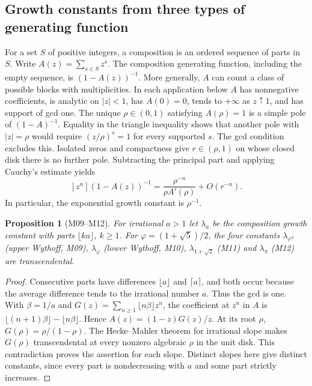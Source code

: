 \documentclass[11pt,a4paper]{article}
\newtheorem{proposition}[theorem]{Proposition}
\theoremstyle{definition}
\theoremstyle{remark}
\begin{document}
\subsection{Growth constants from three types of generating function}

For a set $S$ of positive integers, a composition is an ordered sequence of
parts in $S$. Write $A(z)=\sum_{s\in S}z^s$. The composition generating
function, including the empty sequence, is $(1-A(z))^{-1}$. More generally,
$A$ can count a class of possible blocks with multiplicities.
In each application below $A$ has nonnegative coefficients, is analytic
on $|z|<1$, has $A(0)=0$, tends to $+\infty$ as $z\uparrow1$, and has support
of gcd one. The unique $\rho\in(0,1)$ satisfying $A(\rho)=1$ is a simple
pole of $(1-A)^{-1}$. Equality in the triangle inequality shows that another
pole with $|z|=\rho$ would require $(z/\rho)^s=1$ for every supported $s$.
The gcd condition excludes this. Isolated zeros and compactness give
$r\in(\rho,1)$ on whose closed disk there is no further pole. Subtracting
the principal part and applying Cauchy's estimate yields
\[
 [z^n](1-A(z))^{-1}=\frac{\rho^{-n}}{\rho A'(\rho)}+O(r^{-n}).
\]
In particular, the exponential growth constant is $\rho^{-1}$.

\par\hypertarget{cat-M09}{}\label{page:M09}\hypertarget{cat-M10}{}\label{page:M10}\hypertarget{cat-M11}{}\label{page:M11}\hypertarget{cat-M12}{}\label{page:M12}
\begin{proposition}[M09--M12]
For irrational $a>1$ let $\lambda_a$ be the composition growth constant with parts
$\lfloor ka\rfloor$, $k\ge1$. For $\varphi=(1+\sqrt5)/2$, the four constants
$\lambda_{\varphi^2}$ (upper Wythoff, M09), $\lambda_\varphi$ (lower Wythoff, M10),
$\lambda_{1+\sqrt2}$ (M11) and $\lambda_\pi$ (M12) are transcendental.
\end{proposition}
\begin{proof}
Consecutive parts have differences $\lfloor a\rfloor$ and $\lceil a\rceil$,
and both occur because the average difference tends to the irrational number $a$.
Thus the gcd is one. With $\beta=1/a$ and $G(z)=\sum_{n\ge1}\lfloor n\beta\rfloor z^n$,
the coefficient at $z^n$ in $A$ is $\lfloor(n+1)\beta\rfloor-\lfloor n\beta\rfloor$.
Hence $A(z)=(1-z)G(z)/z$. At its root $\rho$, $G(\rho)=\rho/(1-\rho)$.
The Hecke--Mahler theorem for irrational slope \cite{mBeatty} makes
$G(\rho)$ transcendental at every nonzero algebraic $\rho$ in the unit disk.
This contradiction proves the assertion for each slope. Distinct slopes here
give distinct constants, since every part is nondecreasing with $a$ and
some part strictly increases.
\end{proof}
\end{document}
